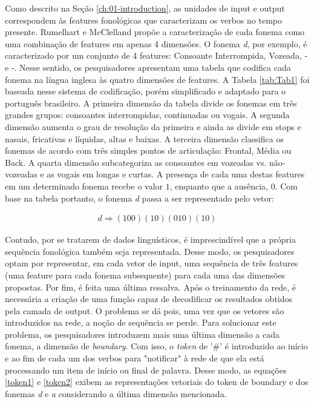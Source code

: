 Como descrito na Seção \ref{ch:01-introduction}, as unidades de input e output correspondem às features fonológicas que caracterizam os verbos no tempo presente. Rumelhart e McClelland propõe a caracterização de cada fonema como uma combinação de features em apenas 4 dimensões. O fonema \textit{d}, por exemplo, é caracterizado por um conjunto de 4 features: Consoante Interrompida, Vozeada, - e -. %
Nesse sentido, os pesquisadores apresentam uma tabela que codifica cada fonema na língua inglesa às quatro dimensões de features. A Tabela \ref{tab:Tab1} foi baseada nesse sistema de codificação, porém simplificado e adaptado para o português brasileiro. A primeira dimensão da tabela divide os fonemas em três grandes grupos: consoantes interrompidas, continuadas ou vogais. A segunda dimensão aumenta o grau de resolução da primeira e ainda as divide em stops e nasais, %
fricativas e líquidas, altas e baixas. A terceira dimensão classifica os fonemas de acordo com três simples pontos de articulação: Frontal, Média ou Back. %
A quarta dimensão subcategoriza as consoantes em vozeadas vs. não-vozeadas e as vogais em longas e curtas. A presença de cada uma destas features em um determinado fonema recebe o valor $1$, enquanto que a ausência, $0$.
Com base na tabela %
portanto, o fonema \textit{d} passa a ser representado pelo vetor:

\begin{align}
d \Rightarrow (100)(10)(010)(10)
\end{align}

Contudo, por se tratarem de dados linguísticos, é imprescindível que a própria sequência fonológica também seja representada. Desse modo, os pesquisadores optam por representar, em cada vetor de input, uma sequência de três features (uma feature para cada fonema subsequente) para cada uma das dimensões propostas. Por fim, é feita uma última ressalva. Após o treinamento da rede, é necessária a criação de uma função capaz de decodificar os resultados obtidos pela camada de output. O problema se dá pois, uma vez que os vetores são introduzidos na rede, a noção de sequência se perde. Para solucionar este problema, os pesquisadores introduzem mais uma última dimensão a cada fonema, a dimensão de \textit{boundary}. Com isso, o \textit{token} de '\#' é introduzido ao início e ao fim de cada um dos verbos para "notificar" à rede de que ela está processando um item de início ou final de palavra. Desse modo, as equações \ref{token1} e \ref{token2} exibem as representações vetoriais do token de boundary e dos fonemas \textit{d} e \textit{a} considerando a última dimensão mencionada.

